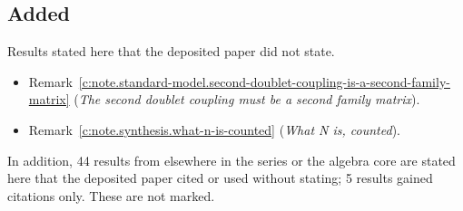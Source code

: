 \documentclass[11pt]{article}
\theoremstyle{definition}
\theoremstyle{plain}
\begin{document}
\subsection*{Added}
Results stated here that the deposited paper did not state.
\begin{itemize}\setlength{\itemsep}{2pt}
\item Remark~\ref{c:note.standard-model.second-doublet-coupling-is-a-second-family-matrix} (\emph{The second doublet coupling must be a second family matrix}).
\item Remark~\ref{c:note.synthesis.what-n-is-counted} (\emph{What N is, counted}).
\end{itemize}
\noindent In addition, 44 results from elsewhere in the series or the algebra core are stated here that the deposited paper cited or used without stating; 5 results gained citations only. These are not marked.
\end{document}
